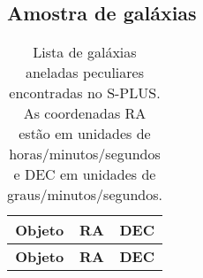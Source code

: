 \begin{apendicesenv}

    \chapter{Amostra de galáxias}

    \captionsetup{justification=justified}

        \begin{longtable}{|c|c|c|}
        \caption{Lista de galáxias aneladas peculiares encontradas no S-PLUS. As coordenadas RA estão em unidades de horas/minutos/segundos e DEC em unidades de graus/minutos/segundos.} \label{tab:splus} \\
            \hline
            \textbf{Objeto} & \textbf{RA} & \textbf{DEC} \\ 
            \hline
            \endfirsthead
            
            \hline
            \textbf{Objeto} & \textbf{RA} & \textbf{DEC} \\ 
            \hline
            \endhead


\end{longtable}
\end{apendicesenv}
